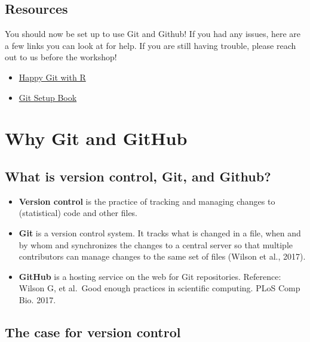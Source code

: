 \documentclass[
]{book}
\providecommand{\tightlist}{%
  \setlength{\itemsep}{0pt}\setlength{\parskip}{0pt}}
\begin{document}
\hypertarget{resources}{%
\section{Resources}\label{resources}}

You should now be set up to use Git and Github! If you had any issues, here are a few links you can look at for help. If you are still having trouble, please reach out to us before the workshop!

\begin{itemize}
\item
  \href{https://happygitwithr.com/}{Happy Git with R}
\item
  \href{https://git-scm.com/book/en/v2/Getting-Started-About-Version-ControlLinks}{Git Setup Book}
\end{itemize}

\hypertarget{why-git-and-github}{%
\chapter{Why Git and GitHub}\label{why-git-and-github}}

\hypertarget{what-is-version-control-git-and-github}{%
\section{What is version control, Git, and Github?}\label{what-is-version-control-git-and-github}}

\begin{itemize}
\tightlist
\item
  \textbf{Version control} is the practice of tracking and managing changes to
  (statistical) code and other files.
\item
  \textbf{Git} is a version control system. It tracks what is changed in a file,
  when and by whom and synchronizes the changes to a central server so that multiple
  contributors can manage changes to the same set of files (Wilson et al., 2017).
\item
  \textbf{GitHub} is a hosting service on the web for Git repositories.
  Reference: Wilson G, et al.~Good enough practices in scientific computing. PLoS Comp Bio. 2017.
\end{itemize}

\hypertarget{the-case-for-version-control}{%
\section{The case for version control}\label{the-case-for-version-control}}
\end{document}
